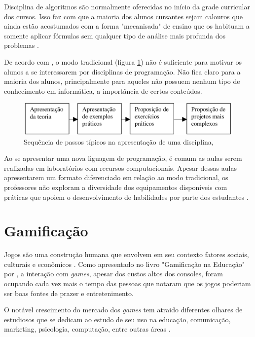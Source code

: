 Disciplina de algoritmos são normalmente oferecidas no início da grade curricular dos cursos. Isso faz com que a maioria dos alunos
cursantes sejam calouros que ainda estão acostumados com a forma "mecanisada" de ensino que os habituam a somente aplicar fórmulas 
sem qualquer tipo de análise mais profunda dos problemas \cite{KOLIVER}.

De acordo com , o modo tradicional (figura \ref{figura4}) não é suficiente para motivar os alunos a se
interessarem por disciplinas de programação. Não fica claro para a maioria dos alunos, principalmente para aqueles
não possuem nenhum tipo de conhecimento em informática, a importância de certos conteúdos.

\begin{figure}[h]
	\centering
	\includegraphics[keepaspectratio=true,scale=0.34]{figuras/modoTradicional.png}
	\caption{Sequência de passos típicos na apresentação de uma disciplina, }
	\label{figura4}
\end{figure}

Ao se apresentar uma nova liguagem de programação, é comum as aulas serem realizadas em laboratórios com
recursos computacionais. Apesar dessas aulas apresentarem um formato diferenciado em relação ao modo tradicional,
os professores não exploram a diversidade dos equipamentos disponíveis com práticas que apoiem o desenvolvimento 
de habilidades por parte dos estudantes \cite{Borges}.

\section{Gamificação}
Jogos são uma construção humana que envolvem em seu contexto fatores sociais, culturais e econômicos \cite{EaDF440}.
Como apresentado no livro "Gamificação na Educação" por , a interação com \textit{games}, apesar
dos custos altos dos consoles, foram ocupando cada vez mais o tempo das pessoas que notaram que os jogos poderiam ser boas fontes
de prazer e entretenimento.

O notável crescimento do mercado dos \textit{games} tem atraido diferentes olhares de estudiosos que se dedicam ao estudo de seu
uso na educação, comunicação, marketing, psicologia, computação, entre outras áreas \cite{da2014gamificaccao}.

